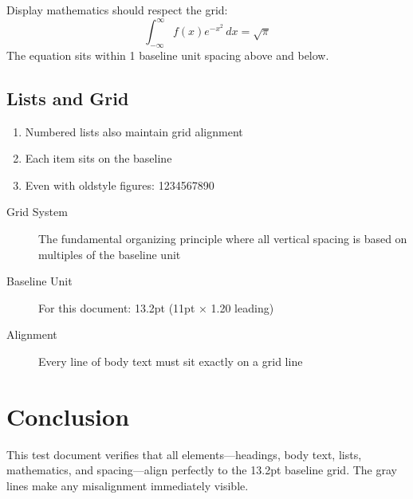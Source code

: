 \documentclass[11pt]{article}
\begin{document}
Display mathematics should respect the grid:
\[
\int_{-\infty}^{\infty} f(x) e^{-x^2} \, dx = \sqrt{\pi}
\]
The equation sits within 1 baseline unit spacing above and below.

\subsection{Lists and Grid}

\begin{enumerate}
\item Numbered lists also maintain grid alignment
\item Each item sits on the baseline
\item Even with oldstyle figures: 1234567890
\end{enumerate}

\begin{description}
\item[Grid System] The fundamental organizing principle where all vertical spacing is based on multiples of the baseline unit
\item[Baseline Unit] For this document: 13.2pt (11pt × 1.20 leading)
\item[Alignment] Every line of body text must sit exactly on a grid line
\end{description}

\section{Conclusion}

This test document verifies that all elements—headings, body text, lists, mathematics, and spacing—align perfectly to the 13.2pt baseline grid. The gray lines make any misalignment immediately visible.
\end{document}
